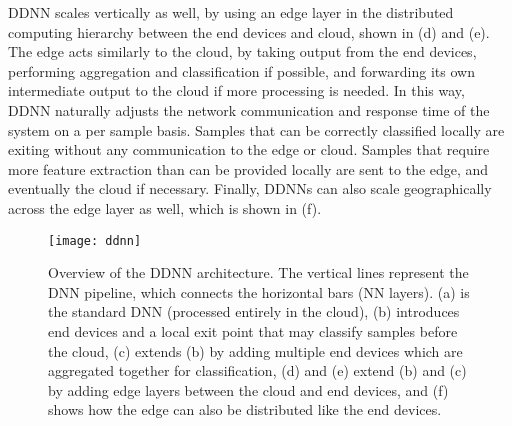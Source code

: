 \documentclass[10pt, conference, compsocconf]{IEEEtran}
\begin{document}
DDNN scales vertically as well, by using an edge layer in the distributed computing hierarchy between the end devices and cloud, shown in (d) and (e). The edge acts similarly to the cloud, by taking output from the end devices, performing aggregation and classification if possible, and forwarding its own intermediate output to the cloud if more processing is needed. In this way, DDNN naturally adjusts the network communication and response time of the system on a per sample basis. Samples that can be correctly classified locally are exiting without any communication to the edge or cloud. Samples that require more feature extraction than can be provided locally are sent to the edge, and eventually the cloud if necessary. Finally, DDNNs can also scale geographically across the edge layer as well, which is shown in (f).


\begin{figure*}
    \centering
    \texttt{[image: ddnn]}
    \caption{Overview of the DDNN architecture. The vertical lines represent the DNN pipeline, which connects the horizontal bars (NN layers). (a) is the standard DNN (processed entirely in the cloud), (b) introduces end devices and a local exit point that may classify samples before the cloud, (c) extends (b) by adding multiple end devices which are aggregated together for classification, (d) and (e) extend (b) and (c) by adding edge layers between the cloud and end devices, and (f) shows how the edge can also be distributed like the end devices.}
    \label{fig:ddnn}
\end{figure*}
\end{document}
